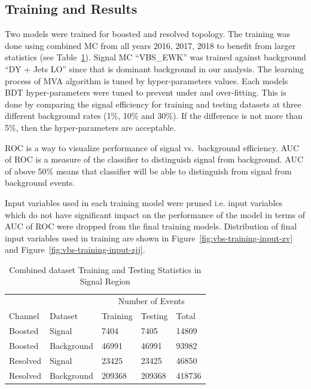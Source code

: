 \subsection{
  Training and Results
}

Two models were trained for boosted and resolved topology.
The training was done using combined MC from all years 2016, 2017, 2018
to benefit from larger statistics (see Table~\ref{tab:training-stats}).
Signal MC ``VBS\_EWK'' was trained against background ``DY + Jets LO'' since
that is dominant background in our analysis.
The learning process of \gls{MVA} algorithm is tuned by hyper-parameters values.
Each models \gls{BDT} hyper-parameters were tuned to prevent under and over-fitting.
This is done by comparing the signal efficiency for
training and testing datasets at three different background rates (1\%, 10\% and 30\%).
If the difference is not more than 5\%, then the hyper-parameters are
acceptable.

\gls{ROC} is a way to visualize performance of signal vs.\ background efficiency.
\gls{AUC} of \gls{ROC} is a measure of the classifier to distinguish signal from background.
\gls{AUC} of above 50\% means that classifier will be able to distinguish from signal
from background events.

Input variables used in each training model were pruned i.e.
input variables which do not have significant impact on the
performance of the model in terms of \gls{AUC} of \gls{ROC}
were dropped from the final training models.
Distribution of final input variables
used in training are shown in Figure~\ref{fig:vbs-training-input-zv} and Figure~\ref{fig:vbs-training-input-zjj}.

\begin{table}[!ht]
  \centering
  \caption{Combined dataset Training and Testing Statistics in Signal Region}
  \begin{tabular}{lllll}%
    \toprule
             &            & \multicolumn{3}{c}{Number of Events}                    \\
    \cmidrule(lr){3-5}
    Channel  & Dataset    & Training                             & Testing & Total  \\
    \midrule
    Boosted  & Signal     & 7404                                 & 7405    & 14809  \\
    Boosted  & Background & 46991                                & 46991   & 93982  \\
    \midrule
    Resolved & Signal     & 23425                                & 23425   & 46850  \\
    Resolved & Background & 209368                               & 209368  & 418736 \\
    \bottomrule
  \end{tabular}\label{tab:training-stats}
\end{table}

